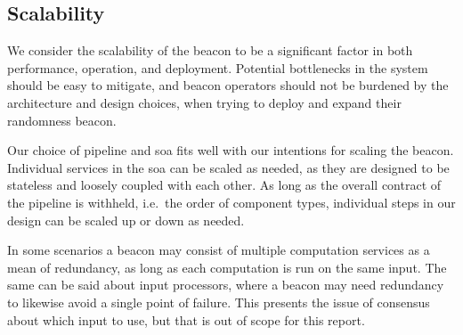 \subsection{Scalability}
We consider the scalability of the beacon to be a significant factor in both performance, operation, and deployment.
Potential bottlenecks in the system should be easy to mitigate, and beacon operators should not be burdened by the architecture and design choices, when trying to deploy and expand their randomness beacon.

Our choice of pipeline and \gls{soa} fits well with our intentions for scaling the beacon.
Individual services in the \gls{soa} can be scaled as needed, as they are designed to be stateless and loosely coupled with each other.
As long as the overall contract of the pipeline is withheld, i.e.\ the order of component types, individual steps in our design can be scaled up or down as needed.

In some scenarios a beacon may consist of multiple computation services as a mean of redundancy, as long as each computation is run on the same input.
The same can be said about input processors, where a beacon may need redundancy to likewise avoid a single point of failure.
This presents the issue of consensus about which input to use, but that is out of scope for this report.

